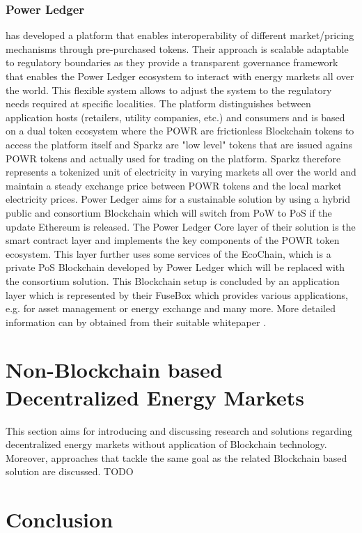 \documentclass[runningheads]{llncs}
\begin{document}
\subsubsection{Power Ledger} has developed a platform that enables interoperability of different market/pricing mechanisms through pre-purchased tokens. Their approach is scalable adaptable to regulatory boundaries as they provide a transparent governance framework that enables the Power Ledger ecosystem to interact with energy markets all over the world. This flexible system allows to adjust the system to the regulatory needs required at specific localities. The platform distinguishes between application hosts (retailers, utility companies, etc.) and consumers and is based on a dual token ecosystem where the POWR are frictionless Blockchain tokens to access the platform itself and Sparkz are "low level" tokens that are issued agains POWR tokens and actually used for trading on the platform. Sparkz therefore represents a tokenized unit of electricity in varying markets all over the world and maintain a steady exchange price between POWR tokens and the local market electricity prices. \cite{powerledger}
Power Ledger aims for a sustainable solution by using a hybrid public and consortium Blockchain which will switch from PoW to PoS if the update Ethereum is released. The Power Ledger Core layer of their solution is the smart contract layer and implements the key components of the POWR token ecosystem. This layer further uses some services of the EcoChain, which is a private PoS Blockchain developed by Power Ledger which will be replaced with the consortium solution. This Blockchain setup is concluded by an application layer which is represented by their FuseBox which provides various applications, e.g. for asset management or energy exchange and many more. More detailed information can by obtained from their suitable whitepaper \cite{powerledger}.

\section{Non-Blockchain based Decentralized Energy Markets}
This section aims for introducing and discussing research and solutions regarding decentralized energy markets without application of Blockchain technology. Moreover, approaches that tackle the same goal as the related Blockchain based solution are discussed.
TODO


\section{Conclusion}
\end{document}

